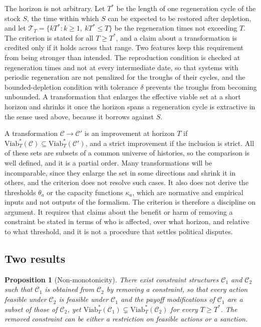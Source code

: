 \documentclass[12pt]{article}
\newtheorem{proposition}{Proposition}[section]
\begin{document}
The horizon is not arbitrary. Let $T^{*}$ be the length of one regeneration cycle of the stock $S$, the time within which $S$ can be expected to be restored after depletion, and let $\mathcal T_T=\{kT^{*}:k\ge 1,\ kT^{*}\le T\}$ be the regeneration times not exceeding $T$. The criterion is stated for all $T\ge T^{*}$, and a claim about a transformation is credited only if it holds across that range. Two features keep this requirement from being stronger than intended. The reproduction condition is checked at regeneration times and not at every intermediate date, so that systems with periodic regeneration are not penalized for the troughs of their cycles, and the bounded-depletion condition with tolerance $\delta$ prevents the troughs from becoming unbounded. A transformation that enlarges the effective viable set at a short horizon and shrinks it once the horizon spans a regeneration cycle is extractive in the sense used above, because it borrows against $S$.

A transformation $\mathcal C\to\mathcal C'$ is an improvement at horizon $T$ if $\mathrm{Viab}^{*}_T(\mathcal C)\subseteq\mathrm{Viab}^{*}_T(\mathcal C')$, and a strict improvement if the inclusion is strict. All of these sets are subsets of a common universe of histories, so the comparison is well defined, and it is a partial order. Many transformations will be incomparable, since they enlarge the set in some directions and shrink it in others, and the criterion does not resolve such cases. It also does not derive the thresholds $\theta_a$ or the capacity functions $\kappa_a$, which are normative and empirical inputs and not outputs of the formalism. The criterion is therefore a discipline on argument. It requires that claims about the benefit or harm of removing a constraint be stated in terms of who is affected, over what horizon, and relative to what threshold, and it is not a procedure that settles political disputes.

\subsection{Two results}

\begin{proposition}[Non-monotonicity]\label{prop:nonmono}
There exist constraint structures $\mathcal C_1$ and $\mathcal C_2$ such that $\mathcal C_1$ is obtained from $\mathcal C_2$ by removing a constraint, so that every action feasible under $\mathcal C_2$ is feasible under $\mathcal C_1$ and the payoff modifications of $\mathcal C_1$ are a subset of those of $\mathcal C_2$, yet $\mathrm{Viab}^{*}_T(\mathcal C_1)\subsetneq\mathrm{Viab}^{*}_T(\mathcal C_2)$ for every $T\ge T^{*}$. The removed constraint can be either a restriction on feasible actions or a sanction.
\end{proposition}
\end{document}
